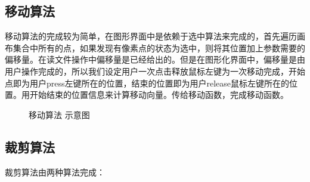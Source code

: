 \documentclass[a4paper,UTF8]{article}
\theoremstyle{definition}
\begin{document}
\subsection{移动算法}
移动算法的完成较为简单，在图形界面中是依赖于选中算法来完成的，首先遍历画布集合中所有的点，如果发现有像素点的状态为选中，则将其位置加上参数需要的偏移量。在读文件操作中偏移量是已经给出的。但是在图形化界面中，偏移量是由用户操作完成的，所以我们设定用户一次点击释放鼠标左键为一次移动完成，开始点即为用户press左键所在的位置，结束的位置即为用户release鼠标左键所在的位置。用开始结束的位置信息来计算移动向量。传给移动函数，完成移动函数。
\begin{figure}[htbp]
\centering    %
 
 
\caption{移动算法 示意图} %
\label{x1314}  %
\end{figure}
\subsection{裁剪算法}
\par 裁剪算法由两种算法完成：
\end{document}
